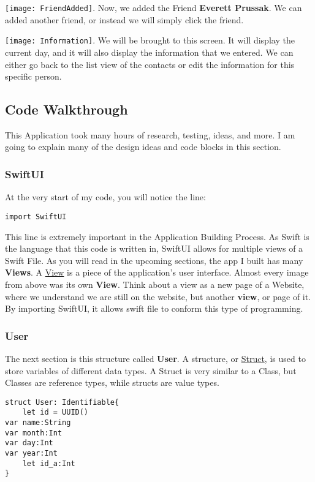 \documentclass{article}
\theoremstyle{theorem}
\theoremstyle{definition}
\theoremstyle{remark}
\begin{document}
\texttt{[image: FriendAdded]}\noindent{}. Now, we added the Friend \textbf{Everett Prussak}. We can added another friend, or instead we will simply click the friend.\newline\newline

\texttt{[image: Information]}\noindent{}. We will be brought to this screen. It will display the current day, and it will also display the information that we entered. We can either go back to the list view of the contacts or edit the information for this specific person.


\subsection{Code Walkthrough}
\noindent This Application took many hours of research, testing, ideas, and more. I am going to explain many of the design ideas and code blocks in this section.

\subsubsection{SwiftUI}
At the very start of my code, you will notice the line:
\begin{verbatim}
import SwiftUI
\end{verbatim}

This line is extremely important in the Application Building Process. As Swift is the language that this code is written in, SwiftUI allows for multiple views of a Swift File. As you will read in the upcoming sections, the app I built has many \textbf{Views}. A \href{https://cocoacasts.com/swiftui-fundamentals-what-is-a-view}{View} is a piece of the application's user interface. Almost every image from above was its own \textbf{View}. Think about a view as a new page of a Website, where we understand we are still on the website, but another \textbf{view}, or page of it. By importing SwiftUI, it allows swift file to conform this type of programming.

\subsubsection{User}
The next section is this structure called \textbf{User}. A structure, or \href{https://www.programiz.com/swift-programming/structs#:~:text=In%20Swift%2C%20a%20struct%20is,same%20information%20of%20multiple%20people.}{Struct}, is used to store variables of different data types. 
\noindent A Struct is very similar to a Class, but Classes are reference types, while structs are value types.
\begin{verbatim}
struct User: Identifiable{
    let id = UUID()
var name:String
var month:Int
var day:Int
var year:Int
    let id_a:Int
}
\end{verbatim}
\end{document}
